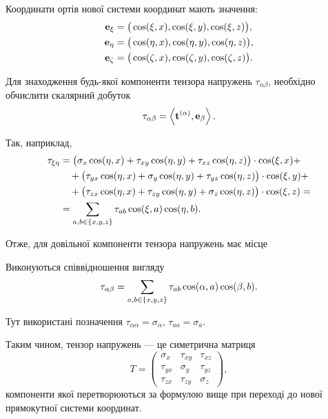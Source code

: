 Координати ортів нової системи координат мають значення:
\begin{align}
	\bf{e}_\xi &= \big( \cos (\xi, x), \cos (\xi, y), \cos (\xi, z) \big), \\
	\bf{e}_\eta &= \big( \cos (\eta, x), \cos (\eta, y), \cos (\eta, z) \big), \\
	\bf{e}_\zeta &= \big( \cos (\zeta, x), \cos (\zeta, y), \cos (\zeta, z) \big).
\end{align}
 
Для знаходження будь-якої компоненти тензора напружень $\tau_{\alpha\beta}$, необхідно обчислити скалярний добуток
\begin{equation}
	\tau_{\alpha \beta} = \langle \bf{t}^{(\alpha)}, \bf{e}_\beta \rangle.
\end{equation}

Так, наприклад,
\begin{equation}
	\begin{aligned}
		\tau_{\xi \eta} &= \big( \sigma_x \cos (\eta, x) + \tau_{x y} \cos (\eta, y) + \tau_{x z} \cos (\eta, z) \big) \cdot \cos (\xi, x) + \\
		&\quad + \big( \tau_{y x} \cos (\eta, x) + \sigma_y \cos (\eta, y) + \tau_{y z} \cos (\eta, z) \big) \cdot \cos (\xi, y) + \\
		&\quad + \big( \tau_{z x} \cos (\eta, x) + \tau_{z y} \cos (\eta, y) + \sigma_z \cos (\eta, z) \big) \cdot \cos (\xi, z) = \\
		&= \Sum_{a, b \in \{x, y, z\}} \tau_{a b} \cos (\xi, a) \cos (\eta, b).
	\end{aligned}
\end{equation}

Отже, для довільної компоненти тензора напружень має місце 
\begin{theorem}
	Виконуються співвідношення вигляду
	\begin{equation}
		\tau_{\alpha \beta} = \Sum_{a, b \in \{x, y, z\}} \tau_{a b} \cos (\alpha, a) \cos (\beta, b).
	\end{equation}
\end{theorem}

\begin{remark}
	Тут використані позначення $\tau_{\alpha \alpha} = \sigma_\alpha$, $\tau_{a a} = \sigma_a$.
\end{remark}

Таким чином, тензор напружень --- це симетрична матриця
\begin{equation}
	T = 
	\begin{pmatrix}
		\sigma_x & \tau_{xy} & \tau_{xz} \\
		\tau_{yx} & \sigma_y & \tau_{yz} \\
		\tau_{zx} & \tau_{zy} & \sigma_z
	\end{pmatrix},
\end{equation}
компоненти якої перетворюються за формулою вище при переході до нової прямокутної системи координат. \medskip

